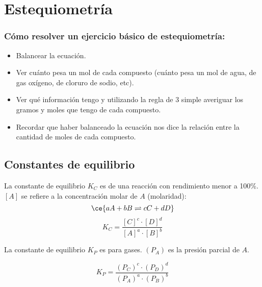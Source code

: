 \section{Estequiometría}
\subsubsection*{Cómo resolver un ejercicio básico de estequiometría:}

\begin{itemize}
    \item Balancear la ecuación.
    \item Ver cuánto pesa un mol de cada compuesto (cuánto pesa un mol de agua, de gas oxígeno, de cloruro de sodio, etc).
    \item Ver qué información tengo y utilizando la regla de 3 simple averiguar los gramos y moles que tengo de cada compuesto.
    \item Recordar que haber balanceado la ecuación nos dice la relación entre la cantidad de moles de cada compuesto.
\end{itemize}

\subsection*{Constantes de equilibrio}

La constante de equilibrio $K_C$ es de una reacción con rendimiento menor a 100\%. $[A]$ se refiere a la concentración molar de $A$ (molaridad):
$$\ce{
aA + bB \rightleftharpoons cC + dD
}$$
$$
K_C = \dfrac{[C]^c \cdot [D]^d}{[A]^a\cdot [B]^b}
$$

La constante de equilibrio $K_P$ es para gases. $(P_A)$ es la presión parcial de $A$.

$$
K_P = \dfrac{(P_C)^c \cdot (P_D)^d}{(P_A)^a \cdot (P_B)^b}
$$